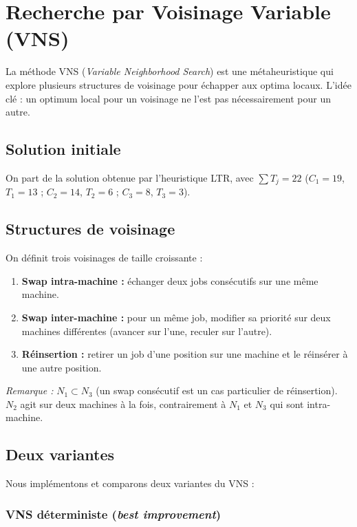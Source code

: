 \section{Recherche par Voisinage Variable (VNS)}

La méthode VNS (\textit{Variable Neighborhood Search}) est une métaheuristique qui explore plusieurs structures de voisinage pour échapper aux optima locaux. L'idée clé : un optimum local pour un voisinage ne l'est pas nécessairement pour un autre.

\subsection{Solution initiale}

On part de la solution obtenue par l'heuristique LTR, avec $\sum T_j = 22$ ($C_1 = 19$, $T_1 = 13$ ; $C_2 = 14$, $T_2 = 6$ ; $C_3 = 8$, $T_3 = 3$).

\subsection{Structures de voisinage}

On définit trois voisinages de taille croissante :

\begin{enumerate}
    \item[\textbf{$N_1$}] \textbf{Swap intra-machine :} échanger deux jobs consécutifs sur une même machine.
    \item[\textbf{$N_2$}] \textbf{Swap inter-machine :} pour un même job, modifier sa priorité sur deux machines différentes (avancer sur l'une, reculer sur l'autre).
    \item[\textbf{$N_3$}] \textbf{Réinsertion :} retirer un job d'une position sur une machine et le réinsérer à une autre position.
\end{enumerate}

\textit{Remarque :} $N_1 \subset N_3$ (un swap consécutif est un cas particulier de réinsertion). $N_2$ agit sur deux machines à la fois, contrairement à $N_1$ et $N_3$ qui sont intra-machine.

\subsection{Deux variantes}

Nous implémentons et comparons deux variantes du VNS :

\subsubsection{VNS déterministe (\textit{best improvement})}

